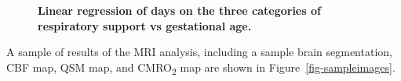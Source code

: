 \documentclass[
  letterpaper,
  DIV=11,
  numbers=noendperiod]{scrartcl}
\begin{document}
\begin{figure}


\caption{\label{fig-linreg}\textbf{Linear regression of days on the
three categories of respiratory support vs gestational age.}}

\end{figure}%

A sample of results of the MRI analysis, including a sample brain
segmentation, CBF map, QSM map, and CMRO\textsubscript{2} map are shown
in Figure~\ref{fig-sampleimages}.
\end{document}
